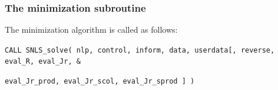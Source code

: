 \documentclass{galahad}
\newcommand{\packagename}{SNLS}
\begin{document}

\subsubsection{The minimization subroutine}
The minimization algorithm is called as follows:
\vspace*{1mm}

\hspace{8mm}
{\tt CALL \packagename\_solve( nlp, control, inform, data, userdata[, 
   reverse, eval\_R, eval\_Jr, \hspace{3mm}                  \&}
\vspace*{-5mm}

\hspace{37mm}
{\tt eval\_Jr\_prod, eval\_Jr\_scol,  eval\_Jr\_sprod ] )}
\end{document}
